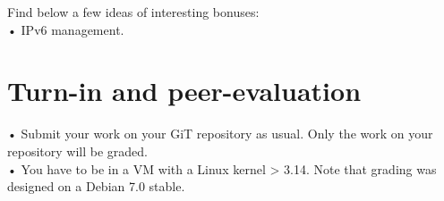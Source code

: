 \documentclass{42-en}
\begin{document}
 Find below a few ideas of interesting bonuses:\\
 
    • IPv6 management.


\chapter{Turn-in and peer-evaluation}

        • Submit your work on your GiT repository as usual. Only the work on your repository will be graded.\\
        \newline
        • You have to be in a VM with a Linux kernel > 3.14. Note that grading was designed on a Debian 7.0 stable.



\end{document}
